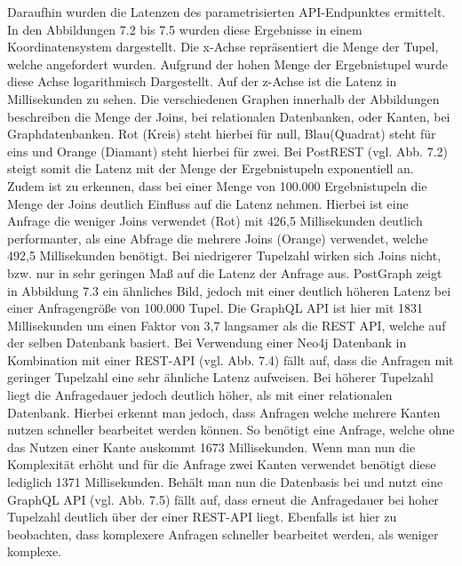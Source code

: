 \noindent
Daraufhin wurden die Latenzen des parametrisierten API-Endpunktes ermittelt. In den Abbildungen 7.2 bis 7.5 wurden diese Ergebnisse in einem Koordinatensystem dargestellt. Die x-Achse repräsentiert die Menge der Tupel, welche angefordert wurden. Aufgrund der hohen Menge der Ergebnistupel wurde diese Achse logarithmisch Dargestellt. Auf der z-Achse ist die Latenz in Millisekunden zu sehen. Die verschiedenen Graphen innerhalb der Abbildungen beschreiben die Menge der Joins, bei relationalen Datenbanken, oder Kanten, bei Graphdatenbanken. Rot (Kreis) steht hierbei für null, Blau(Quadrat) steht für eins und Orange (Diamant) steht hierbei für zwei. 
\newline
Bei PostREST (vgl. Abb. 7.2) steigt somit die Latenz mit der Menge der Ergebnistupeln exponentiell an. Zudem ist zu erkennen, dass bei einer Menge von 100.000 Ergebnistupeln die Menge der Joins deutlich Einfluss auf die Latenz nehmen. Hierbei ist eine Anfrage die weniger Joins verwendet (Rot) mit 426,5 Millisekunden deutlich performanter, als eine Abfrage die mehrere Joins (Orange) verwendet, welche 492,5 Millisekunden benötigt. Bei niedrigerer Tupelzahl wirken sich Joins nicht, bzw. nur in sehr geringen Maß auf die Latenz der Anfrage aus.
\newline
PostGraph zeigt in Abbildung 7.3 ein ähnliches Bild, jedoch mit einer deutlich höheren Latenz bei einer Anfragengröße von 100.000 Tupel. Die GraphQL API ist hier mit 1831 Millisekunden um einen Faktor von 3,7 langsamer als die REST API, welche auf der selben Datenbank basiert.
\newline
Bei Verwendung einer Neo4j Datenbank in Kombination mit einer REST-API (vgl. Abb. 7.4) fällt auf, dass die Anfragen mit geringer Tupelzahl eine sehr ähnliche Latenz aufweisen. Bei höherer Tupelzahl liegt die Anfragedauer jedoch deutlich höher, als mit einer relationalen Datenbank. Hierbei erkennt man jedoch, dass Anfragen welche mehrere Kanten nutzen schneller bearbeitet werden können. So benötigt eine Anfrage, welche ohne das Nutzen einer Kante auskommt 1673 Millisekunden. Wenn man nun die Komplexität erhöht und für die Anfrage zwei Kanten verwendet benötigt diese lediglich 1371 Millisekunden.
 \newline
Behält man nun die Datenbasis bei und nutzt eine GraphQL API (vgl. Abb. 7.5) fällt auf, dass erneut die Anfragedauer bei hoher Tupelzahl deutlich über der einer REST-API liegt. Ebenfalls ist hier zu beobachten, dass komplexere Anfragen schneller bearbeitet werden, als weniger komplexe.
\newline

